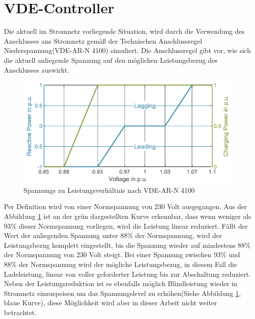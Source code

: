 \section{VDE-Controller}
\label{cap:background_sec:pureVDE}
Die aktuell im Stromnetz vorliegende Situation, wird durch die Verwendung des Anschlusses ans Stromnetz gemäß der Technischen Anschlussregel Niederspannung(VDE-AR-N 4100) simuliert. Die Anschlussregel gibt vor, wie sich die aktuell anliegende Spannung auf den möglichen Leistungsbezug des Anschlusses auswirkt. \\
\begin{figure}[h!]
	\includegraphics[width=\linewidth]{img/VDEGraph.png}
	\caption{Spannungs zu Leistungsverhältnis nach VDE-AR-N 4100}
	\label{Abb_VDEController}
\end{figure}
Per Definition wird von einer Normspannung von 230 Volt ausgegangen. Aus der Abbildung \ref{Abb_VDEController} ist an der grün dargestellten Kurve erkennbar, dass wenn weniger als 93\% dieser Normspannung vorliegen, wird die Leistung linear reduziert. Fällt der Wert der anliegenden Spannung unter 88\% der Normspannung, wird der Leistungsbezug komplett eingestellt, bis die Spannung wieder auf mindestens 88\% der Normspannung von 230 Volt steigt. Bei einer Spannung zwischen 93\% und 88\% der Normspannung wird der mögliche Leistungsbezug, in diesem Fall die Ladeleistung, linear von voller geforderter Leistung bis zur Abschaltung reduziert.\\
Neben der Leistungsreduktion ist es ebenfalls möglich Blindleistung wieder in Stromnetz einzuspeisen um das Spannungslevel zu erhöhen(Siehe Abbildung \ref{Abb_VDEController}, blaue Kurve), diese Möglichkeit wird aber in dieser Arbeit nicht weiter betrachtet.

